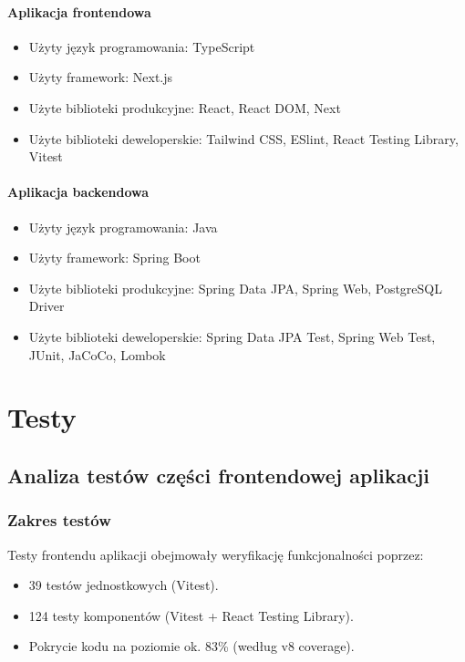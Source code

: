 \documentclass[12pt,a4paper]{article}
\begin{document}
\paragraph{Aplikacja frontendowa}
\begin{itemize}
    \item Użyty język programowania: TypeScript
    \item Użyty framework: Next.js
    \item Użyte biblioteki produkcyjne: React, React DOM, Next
    \item Użyte biblioteki deweloperskie: Tailwind CSS, ESlint, React Testing Library, Vitest
\end{itemize}

\paragraph{Aplikacja backendowa}
\begin{itemize}
    \item Użyty język programowania: Java
    \item Użyty framework: Spring Boot
    \item Użyte biblioteki produkcyjne: Spring Data JPA, Spring Web, PostgreSQL Driver
    \item Użyte biblioteki deweloperskie: Spring Data JPA Test, Spring Web Test, JUnit, JaCoCo, Lombok
\end{itemize}

\section{Testy}
\subsection{Analiza testów części frontendowej aplikacji}
\subsubsection{Zakres testów}
Testy frontendu aplikacji obejmowały weryfikację funkcjonalności poprzez:
\begin{itemize}
    \item 39 testów jednostkowych (Vitest).
    \item 124 testy komponentów (Vitest + React Testing Library).
    \item Pokrycie kodu na poziomie ok. 83\% (według v8 coverage).
\end{itemize}
\end{document}
